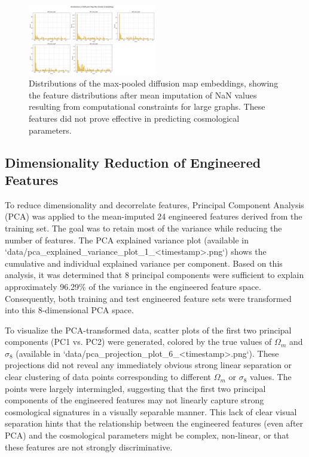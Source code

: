 \documentclass[twocolumn]{aastex631}
\begin{document}
\begin{figure}[h!]
    \centering
    \includegraphics[width=0.5\textwidth]{../input_files/plots/engineered_feature_dist_diff_max_4_20250527-135752.png}
    \caption{Distributions of the max-pooled diffusion map embeddings, showing the feature distributions after mean imputation of NaN values resulting from computational constraints for large graphs. These features did not prove effective in predicting cosmological parameters.}
    \label{fig:diffusion_feature_dist}
\end{figure}

\subsection{Dimensionality Reduction of Engineered Features}

To reduce dimensionality and decorrelate features, Principal Component Analysis (PCA) was applied to the mean-imputed 24 engineered features derived from the training set. The goal was to retain most of the variance while reducing the number of features. The PCA explained variance plot (available in `data/pca_explained_variance_plot_1_<timestamp>.png`) shows the cumulative and individual explained variance per component. Based on this analysis, it was determined that 8 principal components were sufficient to explain approximately 96.29\% of the variance in the engineered feature space. Consequently, both training and test engineered feature sets were transformed into this 8-dimensional PCA space.

To visualize the PCA-transformed data, scatter plots of the first two principal components (PC1 vs. PC2) were generated, colored by the true values of $\Omega_m$ and $\sigma_8$ (available in `data/pca_projection_plot_6_<timestamp>.png`). These projections did not reveal any immediately obvious strong linear separation or clear clustering of data points corresponding to different $\Omega_m$ or $\sigma_8$ values. The points were largely intermingled, suggesting that the first two principal components of the engineered features may not linearly capture strong cosmological signatures in a visually separable manner. This lack of clear visual separation hints that the relationship between the engineered features (even after PCA) and the cosmological parameters might be complex, non-linear, or that these features are not strongly discriminative.
\end{document}
